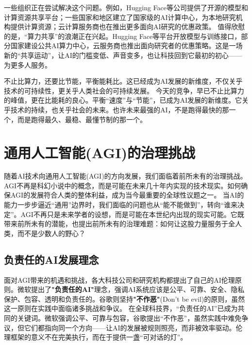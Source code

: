 一些组织正在尝试解决这个问题。例如，Hugging Face等公司提供了开源的模型和计算资源共享平台；一些国家和地区建立了国家级的AI计算中心，为本地研究机构提供计算资源；云计算服务商也在推出更多面向AI研究的优惠政策。
值得欣慰的是，“算力共享”的浪潮正在兴起。Hugging Face等平台开放模型与训练接口，部分国家建设公共AI算力中心，云服务商也推出面向研究者的优惠策略。这是一场新的“共享运动”，让AI的门槛变低、声音变多，也让科技回到它最初的初心——为更多人服务。

不止比算力，还要比节能，平衡能耗比。这已经成为AI发展的新维度，不仅关乎技术的可持续性，更关乎人类社会的可持续发展。
今天的竞争，早已不止比算力的峰值，更在比能耗的良心。平衡“速度”与“节能”，已成为AI发展的新维度。它关乎技术的持续，也关乎社会的未来。也许未来最强的AI，不是跑得最快的那一个，而是跑得最久、最稳、最懂节制的那一个。


\section{通用人工智能(AGI)的治理挑战}

随着AI技术向通用人工智能(AGI)的方向发展，我们面临着前所未有的治理挑战。AGI不再是科幻小说中的概念，而是可能在未来几十年内实现的技术现实。如何确保AGI的发展符合人类的整体利益，成为当今最重要的全球性议题之一。
当AI的能力一步步逼近“通用”边界时，我们面临的问题也从“能不能做到”，转向“谁来决定”。AGI不再只是未来学者的设想，而是可能在本世纪内出现的现实可能。它既带来前所未有的潜能，也提出前所未有的治理难题：如何让这股力量服务于全人类，而不是少数人的野心？

\subsection{负责任的AI发展理念}

面对AGI带来的机遇和挑战，各大科技公司和研究机构都提出了自己的AI伦理原则。微软提出了{\bf "负责任的AI"}理念，强调AI系统应该是公平、可靠、安全、隐私保护、包容、透明和负责任的。谷歌则坚持{\bf "不作恶"}(Don't be evil)的原则，虽然这一原则在实践中面临诸多挑战和争议。
在全球科技界，“负责任的AI”已成为共同的关键词。微软强调公平、可靠与包容，谷歌提出“不作恶”，虽然实践中难免争议，但它们都指向同一个方向——让AI的发展被规则照亮，而非被效率驱动。伦理框架的意义不在完美执行，而在于提供一盏“可对话的灯”。

